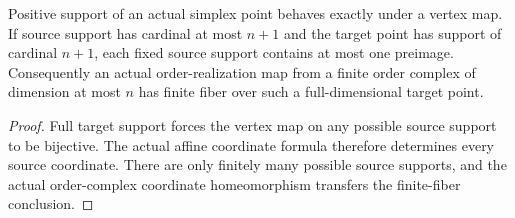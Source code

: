 \begin{proposition}
  \label{prop:actual-full-support-finite-fibers}
  \leanok
  Positive support of an actual simplex point behaves exactly under a vertex map. If source support has cardinal at most $n+1$ and the target point has support of cardinal $n+1$, each fixed source support contains at most one preimage. Consequently an actual order-realization map from a finite order complex of dimension at most $n$ has finite fiber over such a full-dimensional target point.
\end{proposition}
\begin{proof}
  Full target support forces the vertex map on any possible source support to be bijective. The actual affine coordinate formula therefore determines every source coordinate. There are only finitely many possible source supports, and the actual order-complex coordinate homeomorphism transfers the finite-fiber conclusion.
  \leanok
\end{proof}

